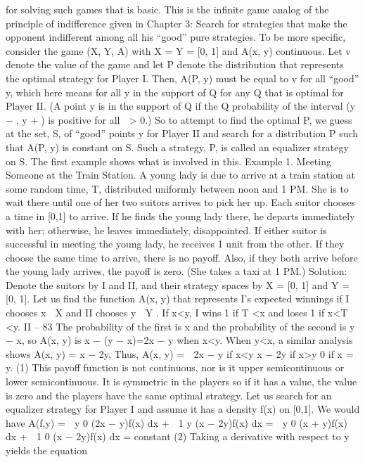 for solving such games that is basic. This is the infinite game analog of the principle of
indifference given in Chapter 3: Search for strategies that make the opponent indifferent
among all his “good” pure strategies.
To be more specific, consider the game (X, Y, A) with X = Y = [0, 1] and A(x, y)
continuous. Let v denote the value of the game and let P denote the distribution that
represents the optimal strategy for Player I. Then, A(P, y) must be equal to v for all
“good” y, which here means for all y in the support of Q for any Q that is optimal for
Player II. (A point y is in the support of Q if the Q probability of the interval (y −, y +)
is positive for all  > 0.) So to attempt to find the optimal P, we guess at the set, S, of
“good” points y for Player II and search for a distribution P such that A(P, y) is constant
on S. Such a strategy, P, is called an equalizer strategy on S. The first example shows
what is involved in this.
Example 1. Meeting Someone at the Train Station. A young lady is due to
arrive at a train station at some random time, T, distributed uniformly between noon and
1 PM. She is to wait there until one of her two suitors arrives to pick her up. Each suitor
chooses a time in [0,1] to arrive. If he finds the young lady there, he departs immediately
with her; otherwise, he leaves immediately, disappointed. If either suitor is successful in
meeting the young lady, he receives 1 unit from the other. If they choose the same time
to arrive, there is no payoff. Also, if they both arrive before the young lady arrives, the
payoff is zero. (She takes a taxi at 1 PM.)
Solution: Denote the suitors by I and II, and their strategy spaces by X = [0, 1]
and Y = [0, 1]. Let us find the function A(x, y) that represents I’s expected winnings if I
chooses x ∈ X and II chooses y ∈ Y . If x<y, I wins 1 if T <x and loses 1 if x<T <y.
II – 83
The probability of the first is x and the probability of the second is y − x, so A(x, y) is
x − (y − x)=2x − y when x<y. When y<x, a similar analysis shows A(x, y) = x − 2y,
Thus,
A(x, y) =  2x − y if x<y
x − 2y if x>y
0 if x = y.
(1)
This payoff function is not continuous, nor is it upper semicontinuous or lower semicontinuous.
It is symmetric in the players so if it has a value, the value is zero and the players
have the same optimal strategy.
Let us search for an equalizer strategy for Player I and assume it has a density f(x)
on [0,1]. We would have
A(f,y) =  y
0
(2x − y)f(x) dx +
 1
y
(x − 2y)f(x) dx
=
 y
0
(x + y)f(x) dx +
 1
0
(x − 2y)f(x) dx = constant
(2)
Taking a derivative with respect to y yields the equation
